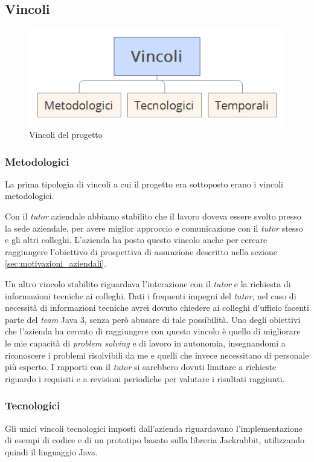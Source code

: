 	\subsection{Vincoli}
		\begin{figure}[H]
		\centering
			\includegraphics[scale=0.5]{immagini/vincoli}
			\caption{Vincoli del progetto}
		\end{figure}
	
	\subsubsection*{Metodologici}
		La prima tipologia di vincoli a cui il progetto era sottoposto erano i vincoli metodologici.
		
		
		Con il \textit{tutor} aziendale abbiamo stabilito che il lavoro doveva essere svolto presso la sede aziendale, per avere miglior approccio e comunicazione con il \textit{tutor} stesso e gli altri colleghi. L'azienda ha posto questo vincolo anche per cercare raggiungere l'obiettivo di prospettiva di assunzione descritto nella sezione \ref{sec:motivazioni_aziendali}.
		
		
		Un altro vincolo stabilito riguardava l'interazione con il \textit{tutor} e la richiesta di informazioni tecniche ai colleghi. Dati i frequenti impegni del \textit{tutor}, nel caso di necessità di informazioni tecniche avrei dovuto chiedere ai colleghi d'ufficio facenti parte del \textit{team} Java 3, senza però abusare di tale possibilità. Uno degli obiettivi che l'azienda ha cercato di raggiungere con questo vincolo è quello di migliorare le mie capacità di \textit{problem solving} e di lavoro in autonomia, insegnandomi a riconoscere i problemi risolvibili da me e quelli che invece necessitano di personale più esperto. I rapporti con il \textit{tutor} si sarebbero dovuti limitare a richieste riguardo i requisiti e a revisioni periodiche per valutare i risultati raggiunti.
		
	\subsubsection*{Tecnologici}
		\label{sec:vincoli-tecnologici}
		Gli unici vincoli tecnologici imposti dall'azienda riguardavano l'implementazione di esempi di codice e di un prototipo basato sulla libreria Jackrabbit, utilizzando quindi il linguaggio Java.
		

